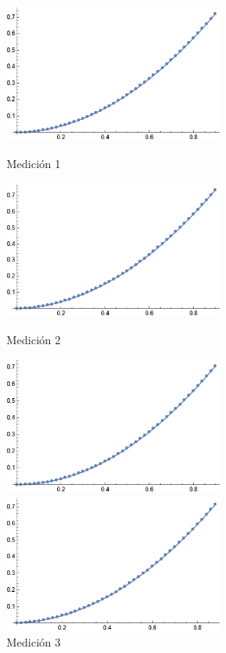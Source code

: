 \documentclass[12pt, titlepage]{report}
\begin{document}
    \begin{figure}[ht]
        \centering
        \begin{minipage}[c]{0.45\linewidth}
            \centering
            \includegraphics[width=7cm]{Graf1.png}
            \caption{Medición 1}
        \end{minipage} \hspace{.75cm}
        \begin{minipage}[c]{0.45\linewidth}
            \centering
            \includegraphics[width=7cm]{Graf2.png}
            \caption{Medición 2}
        \end{minipage}
        \par\bigskip
        \begin{minipage}[c]{0.45\linewidth}
            \centering
            \includegraphics[width=7cm]{Graf3.png}
            \caption{Medición 3}
        \end{minipage} \hspace{.75cm}
        \begin{minipage}[c]{0.45\linewidth}
            \centering
            \includegraphics[width=7cm]{Graf4.png}

\end{minipage}
\end{figure}
\end{document}
